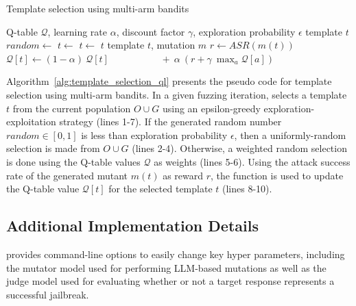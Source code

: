 \begin{algorithm}
\caption{Template selection using multi-arm bandits}
\label{alg:template_selection_ql}
\begin{algorithmic}[1]
\algrenewcommand{}
    Q-table $\mathcal{Q}$, learning rate $\alpha$, discount factor $\gamma$, exploration probability $\epsilon$   
   \Statex
    template $t$
   \State $random \gets$ 
        \State $t \gets$  
    \Else
        \State $t \gets$ 
   \EndIf
   \State \Return $t$
   \EndProcedure
   \Statex
    template $t$, mutation $m$
   \State $r \gets ASR(m(t))$ 
   \State $\mathcal{Q}[t] \gets (1-\alpha)~ \mathcal{Q}[t]$
   \Statex $\quad\quad\quad\quad\quad  +~ \alpha~ (r + \gamma~ \max_{a} \mathcal{Q}[a])$ 
   \EndProcedure
\end{algorithmic}
\end{algorithm}
Algorithm~\ref{alg:template_selection_ql} presents the pseudo code for template selection using multi-arm bandits. In a given fuzzing iteration,  selects a template $t$ from the current population $O \cup G$ using an epsilon-greedy exploration-exploitation strategy (lines 1-7). If the generated random number $random \in [0, 1]$ is less than exploration probability $\epsilon$, then a uniformly-random selection is made from $O \cup G$ (lines 2-4). Otherwise, a weighted random selection is done using the Q-table values $\mathcal{Q}$ as weights (lines 5-6).
Using the attack success rate of the generated mutant $m(t)$ as reward $r$, the  function is used to update the Q-table value $\mathcal{Q}[t]$ for the selected template $t$ (lines 8-10).



\subsection{Additional Implementation Details}
\label{app:implement}
\bedrockfuzz provides command-line options to easily change key hyper parameters, including the mutator model used for performing LLM-based mutations as well as the judge model used for evaluating whether or not a target response represents a successful jailbreak.


